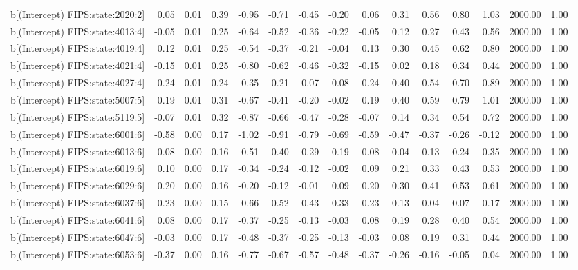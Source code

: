 \begin{table}[ht]
\begin{tabular}{rrrrrrrrrrrrrrr}
  b[(Intercept) FIPS:state:2020:2] & 0.05 & 0.01 & 0.39 & -0.95 & -0.71 & -0.45 & -0.20 & 0.06 & 0.31 & 0.56 & 0.80 & 1.03 & 2000.00 & 1.00 \\ 
  b[(Intercept) FIPS:state:4013:4] & -0.05 & 0.01 & 0.25 & -0.64 & -0.52 & -0.36 & -0.22 & -0.05 & 0.12 & 0.27 & 0.43 & 0.56 & 2000.00 & 1.00 \\ 
  b[(Intercept) FIPS:state:4019:4] & 0.12 & 0.01 & 0.25 & -0.54 & -0.37 & -0.21 & -0.04 & 0.13 & 0.30 & 0.45 & 0.62 & 0.80 & 2000.00 & 1.00 \\ 
  b[(Intercept) FIPS:state:4021:4] & -0.15 & 0.01 & 0.25 & -0.80 & -0.62 & -0.46 & -0.32 & -0.15 & 0.02 & 0.18 & 0.34 & 0.44 & 2000.00 & 1.00 \\ 
  b[(Intercept) FIPS:state:4027:4] & 0.24 & 0.01 & 0.24 & -0.35 & -0.21 & -0.07 & 0.08 & 0.24 & 0.40 & 0.54 & 0.70 & 0.89 & 2000.00 & 1.00 \\ 
  b[(Intercept) FIPS:state:5007:5] & 0.19 & 0.01 & 0.31 & -0.67 & -0.41 & -0.20 & -0.02 & 0.19 & 0.40 & 0.59 & 0.79 & 1.01 & 2000.00 & 1.00 \\ 
  b[(Intercept) FIPS:state:5119:5] & -0.07 & 0.01 & 0.32 & -0.87 & -0.66 & -0.47 & -0.28 & -0.07 & 0.14 & 0.34 & 0.54 & 0.72 & 2000.00 & 1.00 \\ 
  b[(Intercept) FIPS:state:6001:6] & -0.58 & 0.00 & 0.17 & -1.02 & -0.91 & -0.79 & -0.69 & -0.59 & -0.47 & -0.37 & -0.26 & -0.12 & 2000.00 & 1.00 \\ 
  b[(Intercept) FIPS:state:6013:6] & -0.08 & 0.00 & 0.16 & -0.51 & -0.40 & -0.29 & -0.19 & -0.08 & 0.04 & 0.13 & 0.24 & 0.35 & 2000.00 & 1.00 \\ 
  b[(Intercept) FIPS:state:6019:6] & 0.10 & 0.00 & 0.17 & -0.34 & -0.24 & -0.12 & -0.02 & 0.09 & 0.21 & 0.33 & 0.43 & 0.53 & 2000.00 & 1.00 \\ 
  b[(Intercept) FIPS:state:6029:6] & 0.20 & 0.00 & 0.16 & -0.20 & -0.12 & -0.01 & 0.09 & 0.20 & 0.30 & 0.41 & 0.53 & 0.61 & 2000.00 & 1.00 \\ 
  b[(Intercept) FIPS:state:6037:6] & -0.23 & 0.00 & 0.15 & -0.66 & -0.52 & -0.43 & -0.33 & -0.23 & -0.13 & -0.04 & 0.07 & 0.17 & 2000.00 & 1.00 \\ 
  b[(Intercept) FIPS:state:6041:6] & 0.08 & 0.00 & 0.17 & -0.37 & -0.25 & -0.13 & -0.03 & 0.08 & 0.19 & 0.28 & 0.40 & 0.54 & 2000.00 & 1.00 \\ 
  b[(Intercept) FIPS:state:6047:6] & -0.03 & 0.00 & 0.17 & -0.48 & -0.37 & -0.25 & -0.13 & -0.03 & 0.08 & 0.19 & 0.31 & 0.44 & 2000.00 & 1.00 \\ 
  b[(Intercept) FIPS:state:6053:6] & -0.37 & 0.00 & 0.16 & -0.77 & -0.67 & -0.57 & -0.48 & -0.37 & -0.26 & -0.16 & -0.05 & 0.04 & 2000.00 & 1.00 \\ 

\end{tabular}
\end{table}
